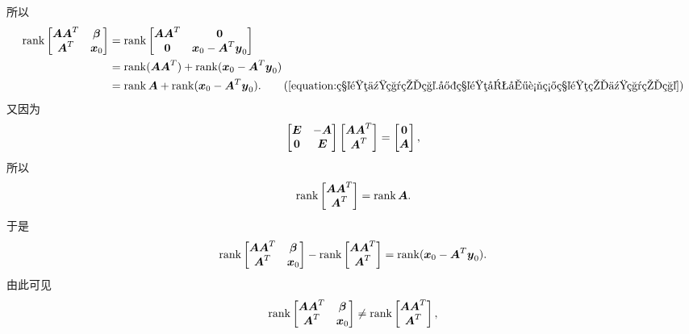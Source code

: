 所以\begin{align*}
	\rank\begin{bmatrix}
		\vb{A} \vb{A}^T & \vb\beta \\
		\vb{A}^T & \vb{x}_0
	\end{bmatrix}
	&= \rank\begin{bmatrix}
		\vb{A} \vb{A}^T & \vb0 \\
		\vb0 & \vb{x}_0 - \vb{A}^T \vb{y}_0
	\end{bmatrix} \\
	&= \rank(\vb{A} \vb{A}^T) + \rank(\vb{x}_0 - \vb{A}^T \vb{y}_0) \\
	&= \rank\vb{A} + \rank(\vb{x}_0 - \vb{A}^T \vb{y}_0).
		\tag{\cref{equation:矩阵乘积的秩.实矩阵及其转置矩阵的乘积的秩}}
\end{align*}
又因为\begin{equation*}
	\begin{bmatrix}
		\boldsymbol{E} & -\boldsymbol{A} \\
		\boldsymbol0 & \boldsymbol{E}
	\end{bmatrix}
	\begin{bmatrix}
		\boldsymbol{A} \boldsymbol{A}^T \\
		\boldsymbol{A}^T
	\end{bmatrix}
	= \begin{bmatrix}
		\boldsymbol0 \\ \boldsymbol{A}
	\end{bmatrix},
\end{equation*}
所以\begin{equation*}
	\rank\begin{bmatrix}
		\boldsymbol{A} \boldsymbol{A}^T \\
		\boldsymbol{A}^T
	\end{bmatrix}
	= \rank\boldsymbol{A}.
\end{equation*}
于是\begin{equation*}
	\rank\begin{bmatrix}
		\boldsymbol{A} \boldsymbol{A}^T & \boldsymbol\beta \\
		\boldsymbol{A}^T & \boldsymbol{x}_0
	\end{bmatrix}
	- \rank\begin{bmatrix}
		\boldsymbol{A} \boldsymbol{A}^T \\
		\boldsymbol{A}^T
	\end{bmatrix}
	= \rank(\boldsymbol{x}_0 - \boldsymbol{A}^T \boldsymbol{y}_0).
\end{equation*}
由此可见\begin{equation*}
	\rank\begin{bmatrix}
		\boldsymbol{A} \boldsymbol{A}^T & \boldsymbol\beta \\
		\boldsymbol{A}^T & \boldsymbol{x}_0
	\end{bmatrix}
	\neq
	\rank\begin{bmatrix}
		\boldsymbol{A} \boldsymbol{A}^T \\
		\boldsymbol{A}^T
	\end{bmatrix},
\end{equation*}

